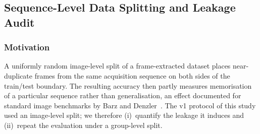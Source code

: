 \documentclass[journal]{IEEEtran}
\begin{document}
\subsection{Sequence-Level Data Splitting and Leakage Audit}
\label{sec:leakage}

\subsubsection{Motivation}
A uniformly random image-level split of a frame-extracted dataset places near-duplicate frames from the same acquisition sequence on both sides of the train/test boundary. The resulting accuracy then partly measures memorisation of a particular sequence rather than generalisation, an effect documented for standard image benchmarks by Barz and Denzler~\cite{barz2020duplicates}. The v1 protocol of this study used an image-level split; we therefore (i)~quantify the leakage it induces and (ii)~repeat the evaluation under a group-level split.
\end{document}
